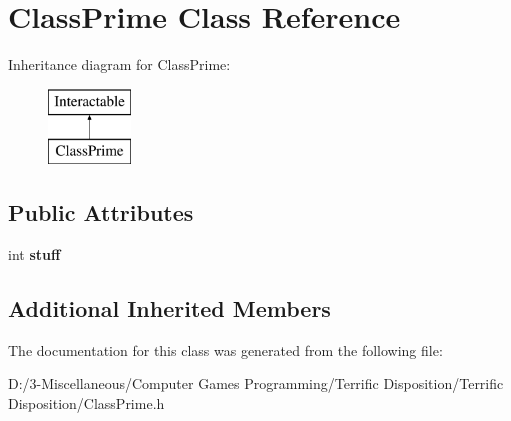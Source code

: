 \hypertarget{class_class_prime}{}\section{Class\+Prime Class Reference}
\label{class_class_prime}
Inheritance diagram for Class\+Prime\+:\begin{figure}[H]
\begin{center}
\leavevmode
\includegraphics[height=2.000000cm]{class_class_prime}
\end{center}
\end{figure}
\subsection*{Public Attributes}
\begin{DoxyCompactItemize}
\item 
\mbox{\label{class_class_prime_a72f0d4d6461fcb110f53ca313f1960d9}} 
int {\bfseries stuff}
\end{DoxyCompactItemize}
\subsection*{Additional Inherited Members}


The documentation for this class was generated from the following file\+:\begin{DoxyCompactItemize}
\item 
D\+:/3-\/\+Miscellaneous/\+Computer Games Programming/\+Terrific Disposition/\+Terrific Disposition/Class\+Prime.\+h\end{DoxyCompactItemize}
